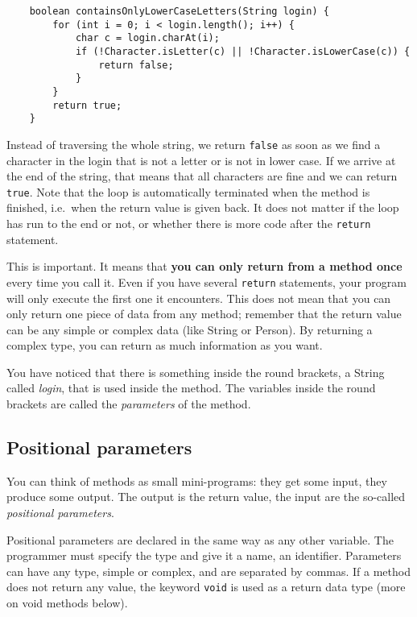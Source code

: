 \begin{verbatim}
    boolean containsOnlyLowerCaseLetters(String login) {
        for (int i = 0; i < login.length(); i++) {
            char c = login.charAt(i);
            if (!Character.isLetter(c) || !Character.isLowerCase(c)) {
                return false;
            }
        }
        return true;
    }
\end{verbatim}

Instead of traversing the whole string, we return \verb+false+ as soon
as we find a character in the login that is not a letter or is not
in lower case. If we arrive at the end of the string, that means that
all characters are fine and we can return \verb+true+. Note that the
loop is automatically terminated when the method is finished,
i.e.~when the return value is given back. It does not matter if the
loop has run to the end or not, or whether there is more code after
the \verb+return+ statement. 

This is important.
It means that \textbf{you can only return from a method once} 
every time you call it. Even if you have
several \verb+return+ statements, your program will only execute the
first one it encounters. This does not mean that you can only return
one piece of data from any method; remember that the return value can
be any simple or complex data (like String or Person). By returning a
complex type, you can return as much information as you want. 

You have noticed that there is something inside the round brackets, a
String called \emph{login}, that is used inside the method. The
variables inside the round brackets are called the \emph{parameters} of the
method. 

\subsection{Positional parameters}
\label{sec:pospar}

You can think of methods as small mini-programs: they get some input,
they produce some output. The output is the return value, the input
are the so-called \emph{positional parameters}. 

Positional parameters are declared in the same way as any other
variable. The programmer must specify the type and give it a name, an
identifier. Parameters can have any type, simple or complex, and
are separated by commas. If a method does not return any value, the
keyword \verb+void+ is used as a return data type (more on void methods
below).

